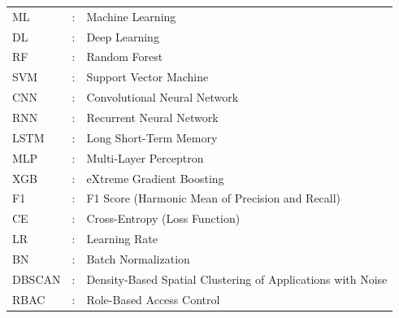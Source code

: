 \documentclass[12pt,a4paper]{report}
\begin{document}
\begin{normalsize}
    \noindent
    {\setlength{\baselineskip}{1.1\baselineskip}
        \vspace{0.2 in}
        \begin{tabular}{lll}
            \vspace{0.1 in}
            ML     & : & Machine Learning \\
            \vspace{0.1 in}
            DL     & : & Deep Learning \\
            \vspace{0.1 in}
            RF     & : & Random Forest \\
            \vspace{0.1 in}
            SVM    & : & Support Vector Machine \\
            \vspace{0.1 in}
            CNN    & : & Convolutional Neural Network \\
            \vspace{0.1 in}
            RNN    & : & Recurrent Neural Network \\
            \vspace{0.1 in}
            LSTM   & : & Long Short-Term Memory \\
            \vspace{0.1 in}
            MLP    & : & Multi-Layer Perceptron \\
            \vspace{0.1 in}
            XGB    & : & eXtreme Gradient Boosting \\
            \vspace{0.1 in}
            F1     & : & F1 Score (Harmonic Mean of Precision and Recall) \\
            \vspace{0.1 in}
            CE     & : & Cross-Entropy (Loss Function) \\
            \vspace{0.1 in}
            LR     & : & Learning Rate \\
            \vspace{0.1 in}
            BN     & : & Batch Normalization \\
            \vspace{0.1 in}
            DBSCAN & : & Density-Based Spatial Clustering of Applications with Noise \\
            \vspace{0.1 in}
            RBAC   & : & Role-Based Access Control \\

\end{tabular}}
\end{normalsize}
\end{document}
